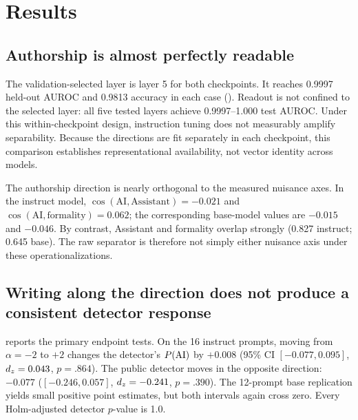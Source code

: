 \section{Results}
\label{sec:results}

\subsection{Authorship is almost perfectly readable}



The validation-selected layer is layer 5 for both checkpoints. It reaches 0.9997 held-out AUROC and 0.9813 accuracy in each case (). Readout is not confined to the selected layer: all five tested layers achieve 0.9997--1.000 test AUROC. Under this within-checkpoint design, instruction tuning does not measurably amplify separability. Because the directions are fit separately in each checkpoint, this comparison establishes representational availability, not vector identity across models.

The authorship direction is nearly orthogonal to the measured nuisance axes. In the instruct model, $\cos(\mathrm{AI},\mathrm{Assistant})=-0.021$ and $\cos(\mathrm{AI},\mathrm{formality})=0.062$; the corresponding base-model values are $-0.015$ and $-0.046$. By contrast, Assistant and formality overlap strongly (0.827 instruct; 0.645 base). The raw separator is therefore not simply either nuisance axis under these operationalizations.

\subsection{Writing along the direction does not produce a consistent detector response}



 reports the primary endpoint tests. On the 16 instruct prompts, moving from $\alpha=-2$ to $+2$ changes the \mage detector's $P(\mathrm{AI})$ by $+0.008$ (95\% CI $[-0.077,0.095]$, $d_z=0.043$, $p=.864$). The public detector moves in the opposite direction: $-0.077$ ($[-0.246,0.057]$, $d_z=-0.241$, $p=.390$). The 12-prompt base replication yields small positive point estimates, but both intervals again cross zero. Every Holm-adjusted detector $p$-value is 1.0.

